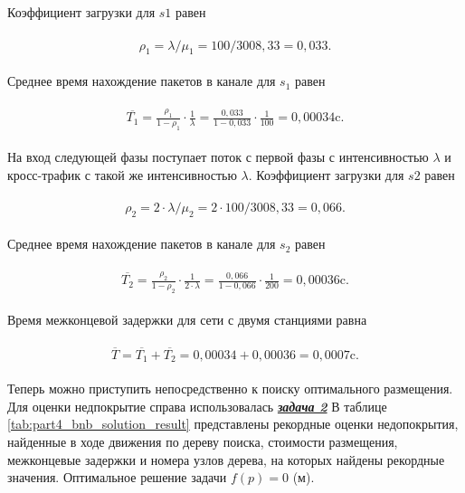 Коэффициент загрузки для $s1$ равен

\begin{align}
  \begin{aligned}
\rho_1 = \lambda / \mu_1 = 100 / 3008,33 = 0,033.
  \end{aligned}
\end{align}

Среднее время нахождение пакетов в канале для $s_1$ равен

\begin{align}
  \begin{aligned}
  \overline{T_1} = \frac{\rho_1}{1 - \rho_1} \cdot \frac{1}{\lambda} = \frac{0,033}{1 - 0,033} \cdot \frac{1}{100} = 0,00034 \text{c}.
  \end{aligned}
\end{align}

На вход следующей фазы поступает поток с первой фазы с интенсивностью $\lambda$ и кросс-трафик с такой же интенсивностью $\lambda$. Коэффициент загрузки для $s2$ равен

\begin{align}
  \begin{aligned}
\rho_2 = 2 \cdot \lambda / \mu_2 = 2 \cdot 100 / 3008,33 = 0,066.
  \end{aligned}
\end{align}

Среднее время нахождение пакетов в канале для $s_2$ равен

\begin{align}
  \begin{aligned}
  \overline{T_2} = \frac{\rho_2}{1 - \rho_2} \cdot \frac{1}{2 \cdot \lambda} = \frac{0,066}{1 - 0,066} \cdot \frac{1}{200} = 0,00036 \text{c}.
  \end{aligned}
\end{align}

Время межконцевой задержки для сети с двумя станциями равна 

\begin{align}
  \begin{aligned}
  \overline{T} =  \overline{T_1} + \overline{T_2} = 0,00034 + 0,00036 = 0,0007 \text{c} .
  \end{aligned}
\end{align}

Теперь можно приступить непосредственно к поиску оптимального размещения. Для оценки недпокрытие справа использовалась \underline{\textit{\textbf{задача 2}}} В таблице \cref{tab:part4_bnb_solution_result} представлены рекордные оценки недопокрытия, найденные в ходе движения по дереву поиска, стоимости размещения, межконцевые задержки и номера узлов дерева, на которых найдены рекордные значения. Оптимальное решение задачи $f(p) = 0$ (м). 


